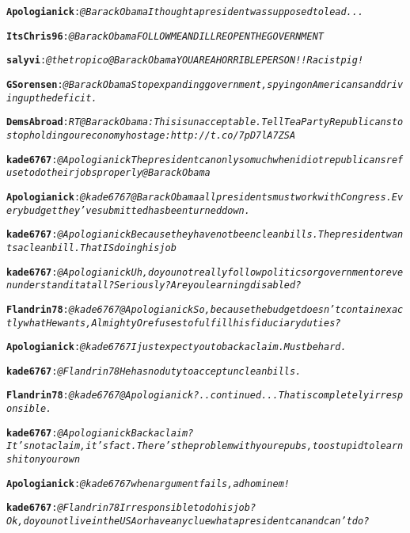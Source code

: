 \begin{alltt}\normalfont\textbf{Apologianick}: \emph{@BarackObama I thought a president was supposed to lead...}

\textbf{ItsChris96}: \emph{@BarackObama FOLLOW ME AND ILL REOPEN THE GOVERNMENT}

\textbf{salyvi}: \emph{@thetropico @BarackObama YOU ARE A HORRIBLE PERSON !!  Racist pig!}

\textbf{GSorensen}: \emph{@BarackObama Stop expanding government, spying on Americans and driving up the deficit.}

\textbf{DemsAbroad}: \emph{RT @BarackObama: This is unacceptable. Tell Tea Party Republicans to stop holding our economy hostage: http://t.co/7pD7lA7ZSA}

\textbf{kade6767}: \emph{@Apologianick The president can only so much when idiot republicans refuse to do their jobs properly @BarackObama}

\textbf{Apologianick}: \emph{@kade6767 @BarackObama all presidents must work with Congress. Every budget they've submitted has been turned down.}

\textbf{kade6767}: \emph{@Apologianick Because they have not been clean bills. The president wants a clean bill. That IS doing his job}

\textbf{kade6767}: \emph{@Apologianick Uh, do you not really follow politics or government or even understand it at all? Seriously? Are you learning disabled?}

\textbf{Flandrin78}: \emph{@kade6767 @Apologianick So, because the budget doesn't contain exactly what He wants, Almighty O refuses to fulfill his fiduciary duties?}

\textbf{Apologianick}: \emph{@kade6767 I just expect you to back a claim. Must be hard.}

\textbf{kade6767}: \emph{@Flandrin78 He has no duty to accept unclean bills.}

\textbf{Flandrin78}: \emph{@kade6767 @Apologianick ?..continued... That is completely irresponsible.}

\textbf{kade6767}: \emph{@Apologianick Back a claim? It's not a claim, it's fact. There's the problem with you repubs, too stupid to learn shit on your own}

\textbf{Apologianick}: \emph{@kade6767 when argument fails, ad hominem!}

\textbf{kade6767}: \emph{@Flandrin78 Irresponsible to do his job? Ok, do you not live in the USA or have any clue what a president can and can't do?}


\end{alltt}
